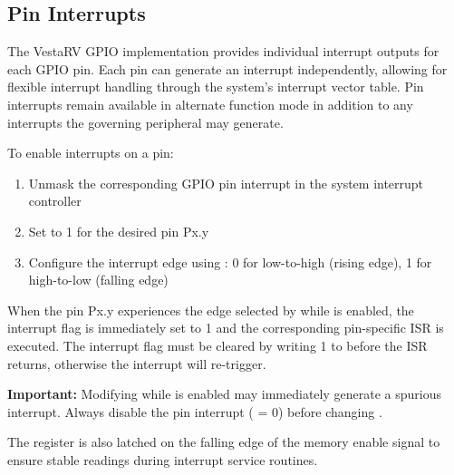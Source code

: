 \subsection{Pin Interrupts}

The VestaRV GPIO implementation provides individual interrupt outputs for each GPIO pin. Each pin can generate an interrupt independently, allowing for flexible interrupt handling through the system's interrupt vector table. Pin interrupts remain available in alternate function mode in addition to any interrupts the governing peripheral may generate.

To enable interrupts on a pin:
\begin{enumerate}
\item Unmask the corresponding GPIO pin interrupt in the system interrupt controller
\item Set  to 1 for the desired pin Px.y
\item Configure the interrupt edge using : 0 for low-to-high (rising edge), 1 for high-to-low (falling edge)
\end{enumerate}

When the pin Px.y experiences the edge selected by  while  is enabled, the interrupt flag  is immediately set to 1 and the corresponding pin-specific ISR is executed. The interrupt flag must be cleared by writing 1 to  before the ISR returns, otherwise the interrupt will re-trigger.

\textbf{Important:} Modifying  while  is enabled may immediately generate a spurious interrupt. Always disable the pin interrupt ( = 0) before changing .

The  register is also latched on the falling edge of the memory enable signal to ensure stable readings during interrupt service routines.
